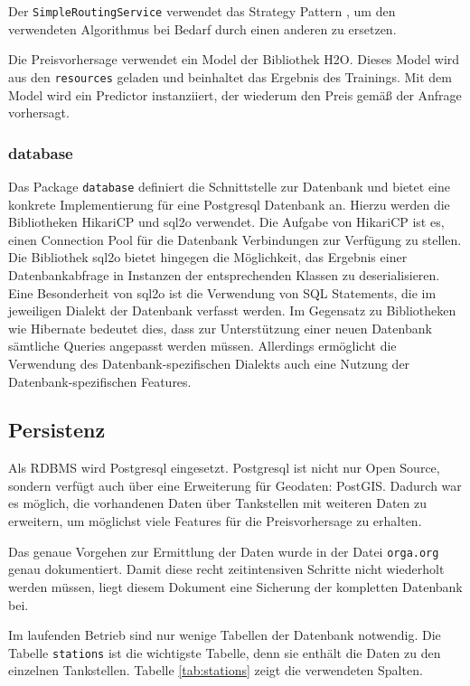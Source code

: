 \documentclass[
ngerman          %
,a4paper          %
,11pt
,pdftex
]{report}
\begin{document}
Der \texttt{SimpleRoutingService} verwendet das Strategy Pattern \cite{gof}, um den verwendeten Algorithmus bei Bedarf durch einen anderen zu ersetzen.

Die Preisvorhersage verwendet ein Model der Bibliothek H2O. Dieses Model wird aus den \texttt{resources} geladen und beinhaltet das Ergebnis des Trainings. Mit dem Model wird ein Predictor instanziiert, der wiederum den Preis gemäß der Anfrage vorhersagt.

\subsubsection{database}
\label{sec:database}

Das Package \texttt{database} definiert die Schnittstelle zur Datenbank und bietet eine konkrete Implementierung für eine Postgresql Datenbank an. Hierzu werden die Bibliotheken HikariCP und sql2o verwendet. Die Aufgabe von HikariCP ist es, einen Connection Pool für die Datenbank Verbindungen zur Verfügung zu stellen. Die Bibliothek sql2o bietet hingegen die Möglichkeit, das Ergebnis einer Datenbankabfrage in Instanzen der entsprechenden Klassen zu deserialisieren. Eine Besonderheit von sql2o ist die Verwendung von SQL Statements, die im jeweiligen Dialekt der Datenbank verfasst werden. Im Gegensatz zu Bibliotheken wie Hibernate bedeutet dies, dass zur Unterstützung einer neuen Datenbank sämtliche Queries angepasst werden müssen. Allerdings ermöglicht die Verwendung des Datenbank-spezifischen Dialekts auch eine Nutzung der Datenbank-spezifischen Features.

\subsection{Persistenz}

Als \ac{RDBMS} wird Postgresql eingesetzt. Postgresql ist nicht nur Open Source, sondern verfügt auch über eine Erweiterung für Geodaten: PostGIS. Dadurch war es möglich, die vorhandenen Daten über Tankstellen mit weiteren Daten zu erweitern, um möglichst viele Features für die Preisvorhersage zu erhalten.

Das genaue Vorgehen zur Ermittlung der Daten wurde in der Datei \texttt{orga.org} genau dokumentiert. Damit diese recht zeitintensiven Schritte nicht wiederholt werden müssen, liegt diesem Dokument eine Sicherung der kompletten Datenbank bei.

Im laufenden Betrieb sind nur wenige Tabellen der Datenbank notwendig. Die Tabelle \texttt{stations} ist die wichtigste Tabelle, denn sie enthält die Daten zu den einzelnen Tankstellen. Tabelle \ref{tab:stations} zeigt die verwendeten Spalten.
\end{document}
